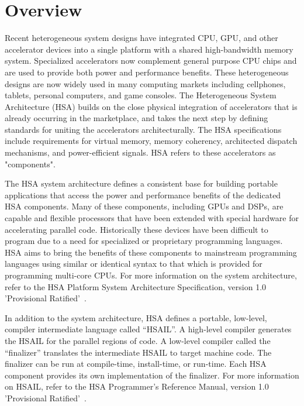 \documentclass[final,oneside]{book}
\begin{document}
\section{Overview}\label{overview}
\vspace{-3mm}
Recent heterogeneous system designs have integrated CPU, GPU, and other
accelerator devices into a single platform with a shared high-bandwidth memory
system.  Specialized accelerators now complement general purpose CPU chips and
are used to provide both power and performance benefits.  These
heterogeneous designs are now widely used in many computing markets including
cellphones, tablets, personal computers, and game consoles. The Heterogeneous
System Architecture (HSA) builds on the close physical integration of
accelerators that is already occurring in the marketplace, and takes the next
step by defining standards for uniting the accelerators architecturally. The HSA
specifications include requirements for virtual memory, memory coherency,
architected dispatch mechanisms, and power-efficient signals. HSA refers to
these accelerators as "components".

The HSA system architecture defines a consistent base for building portable
applications that access the power and performance benefits of the dedicated HSA
components. Many of these components, including GPUs and DSPs, are capable and
flexible processors that have been extended with special hardware for
accelerating parallel code. Historically these devices have been difficult to
program due to a need for specialized or proprietary programming languages. HSA
aims to bring the benefits of these components to mainstream programming
languages using similar or identical syntax to that which is provided for
programming multi-core CPUs. For more information on the system architecture,
refer to the HSA Platform System Architecture Specification, version 1.0
'Provisional Ratified'~\cite{sar}.

In addition to the system architecture, HSA defines a portable, low-level,
compiler intermediate language called ``HSAIL''.  A high-level compiler
generates the HSAIL for the parallel regions of code. A low-level compiler
called the ``finalizer'' translates the intermediate HSAIL to target machine
code. The finalizer can be run at compile-time, install-time, or run-time. Each
HSA component provides its own implementation of the finalizer.  For more
information on HSAIL, refer to the HSA Programmer's Reference Manual, version
1.0 'Provisional Ratified'~\cite{prm}.
\end{document}
